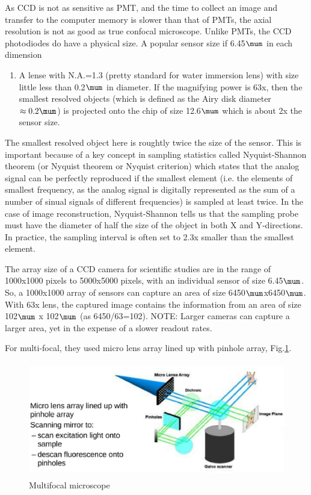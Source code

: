 As CCD is not as sensitive as PMT, and the time to collect an image and transfer
to the computer memory is slower than that of PMTs, the axial resolution is not
as good as true confocal microscope. Unlike PMTs, the CCD photodiodes do have a
physical size. A popular sensor size if 6.45$\mum$ in each dimension
\begin{enumerate}
  \item A lense with N.A.=1.3 (pretty standard for water immersion lens) with
  size little less than 0.2$\mum$ in diameter. If the magnifying power is 63x,
  then the smallest resolved objects (which is defined as the Airy
  disk diameter $\approx 0.2 \mum$) is projected onto the chip of size
  12.6$\mum$ which is about 2x the sensor size. 
\end{enumerate}
The smallest resolved object here is roughtly twice the size of
the sensor. This is important because of a key concept in sampling statistics
called Nyquist-Shannon theorem (or Nyquist theorem or Nyquist criterion) which
states that the analog signal can be perfectly reproduced if the
smallest element (i.e. the elements of smallest frequency, as the analog signal
is digitally represented as the sum of a number of sinual
signals of different frequencies) is sampled at least twice. In the case of
image reconstruction, Nyquist-Shannon tells us that the sampling probe must have
the diameter of half the size of the object in both X and Y-directions. In
practice, the sampling interval is often set to 2.3x smaller than the smallest
element.

The array size of a CCD camera for scientific studies are in the range of
1000x1000 pixels to 5000x5000 pixels, with an individual sensor of size
6.45$\mum$. So, a 1000x1000 array of sensors can capture an area of size
6450$\mum$x6450$\mum$. With 63x lens, the captured image contains the
information from an area of size 102$\mum$ x 102$\mum$ (as 6450/63=102).
NOTE: Larger cameras can capture a larger area, yet in the expense of a slower
readout rates.


For multi-focal, they used micro lens array lined up with pinhole
array, Fig.\ref{fig:multifocal_microscope}.

\begin{figure}[hbt]
  \centerline{\includegraphics[height=5cm,
    angle=0]{./images/multifocal_microscope.eps}}
  \caption{Multifocal microscope}
  \label{fig:multifocal_microscope}
\end{figure}

